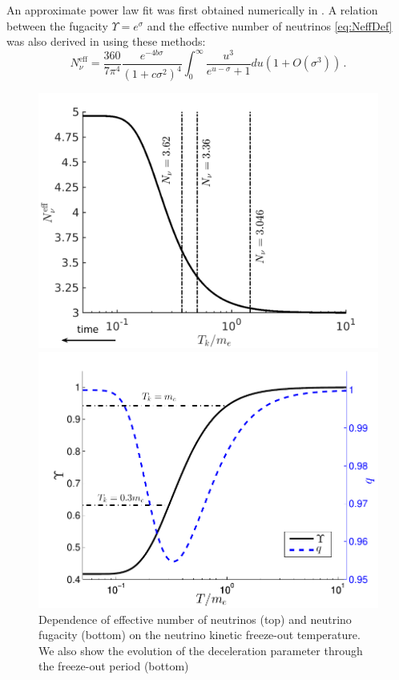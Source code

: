 An approximate power law fit was first obtained numerically in \cite{Birrell:2013gpa}. A relation between the fugacity $\Upsilon=e^\sigma$ and the effective number of neutrinos \eqref{eq:NeffDef} was also derived in \cite{Birrell:2012gg} using these methods:
\begin{equation}\label{eq:NnuApprox}
N^{\mathrm{eff}}_\nu=\frac{360}{7\pi^4}\frac{e^{-4b\sigma}}{(1+c\sigma^2)^4}\int_0^\infty \frac{u^3}{e^{u-\sigma}+1}du\left(1+O(\sigma^3)\right)\,.
\end{equation}


\begin{figure}
\centerline{\includegraphics[width=0.90\linewidth]{04-birrell/ModelIndStudy/Figures/N_eff.pdf}}
\centerline{\includegraphics[width=0.90\linewidth]{04-birrell/ModelIndStudy/Figures/Upsilon_q.pdf}}
\caption{Dependence of effective number of neutrinos (top) and neutrino fugacity (bottom) on the neutrino kinetic freeze-out temperature. We also show the evolution of the deceleration parameter through the freeze-out period (bottom)}
\label{fig:Tk_dependence}
\end{figure}
